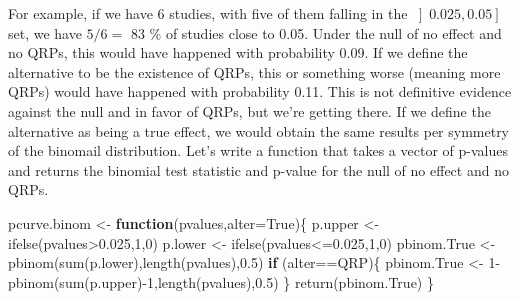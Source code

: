 \documentclass[
]{book}
\newenvironment{Shaded}{\begin{snugshade}}{\end{snugshade}}
\newcommand{\AttributeTok}[1]{\textcolor[rgb]{0.77,0.63,0.00}{#1}}
\newcommand{\ControlFlowTok}[1]{\textcolor[rgb]{0.13,0.29,0.53}{\textbf{#1}}}
\newcommand{\DecValTok}[1]{\textcolor[rgb]{0.00,0.00,0.81}{#1}}
\newcommand{\FloatTok}[1]{\textcolor[rgb]{0.00,0.00,0.81}{#1}}
\newcommand{\FunctionTok}[1]{\textcolor[rgb]{0.00,0.00,0.00}{#1}}
\newcommand{\NormalTok}[1]{#1}
\newcommand{\OtherTok}[1]{\textcolor[rgb]{0.56,0.35,0.01}{#1}}
\newcommand{\SpecialCharTok}[1]{\textcolor[rgb]{0.00,0.00,0.00}{#1}}
\newcommand{\StringTok}[1]{\textcolor[rgb]{0.31,0.60,0.02}{#1}}
\theoremstyle{definition}
\theoremstyle{definition}
\theoremstyle{definition}
\theoremstyle{definition}
\theoremstyle{remark}
\begin{document}
For example, if we have 6 studies, with five of them falling in the \(\left]0.025,0.05\right]\) set, we have \(5/6=\) 83 \% of studies close to 0.05.
Under the null of no effect and no QRPs, this would have happened with probability 0.09.
If we define the alternative to be the existence of QRPs, this or something worse (meaning more QRPs) would have happened with probability 0.11.
This is not definitive evidence against the null and in favor of QRPs, but we're getting there.
If we define the alternative as being a true effect, we would obtain the same results per symmetry of the binomail distribution.
Let's write a function that takes a vector of p-values and returns the binomial test statistic and p-value for the null of no effect and no QRPs.

\begin{Shaded}
\begin{Highlighting}[]
\NormalTok{pcurve.binom }\OtherTok{\textless{}{-}} \ControlFlowTok{function}\NormalTok{(pvalues,}\AttributeTok{alter=}\StringTok{\textquotesingle{}True\textquotesingle{}}\NormalTok{)\{}
\NormalTok{  p.upper }\OtherTok{\textless{}{-}} \FunctionTok{ifelse}\NormalTok{(pvalues}\SpecialCharTok{\textgreater{}}\FloatTok{0.025}\NormalTok{,}\DecValTok{1}\NormalTok{,}\DecValTok{0}\NormalTok{)}
\NormalTok{  p.lower }\OtherTok{\textless{}{-}} \FunctionTok{ifelse}\NormalTok{(pvalues}\SpecialCharTok{\textless{}=}\FloatTok{0.025}\NormalTok{,}\DecValTok{1}\NormalTok{,}\DecValTok{0}\NormalTok{)}
\NormalTok{  pbinom.True }\OtherTok{\textless{}{-}} \FunctionTok{pbinom}\NormalTok{(}\FunctionTok{sum}\NormalTok{(p.lower),}\FunctionTok{length}\NormalTok{(pvalues),}\FloatTok{0.5}\NormalTok{)}
  \ControlFlowTok{if}\NormalTok{ (alter}\SpecialCharTok{==}\StringTok{\textquotesingle{}QRP\textquotesingle{}}\NormalTok{)\{}
\NormalTok{    pbinom.True }\OtherTok{\textless{}{-}} \DecValTok{1}\SpecialCharTok{{-}}\FunctionTok{pbinom}\NormalTok{(}\FunctionTok{sum}\NormalTok{(p.upper)}\SpecialCharTok{{-}}\DecValTok{1}\NormalTok{,}\FunctionTok{length}\NormalTok{(pvalues),}\FloatTok{0.5}\NormalTok{)}
\NormalTok{  \}}
  \FunctionTok{return}\NormalTok{(pbinom.True)}
\NormalTok{\}}
\end{Highlighting}
\end{Shaded}
\end{document}
